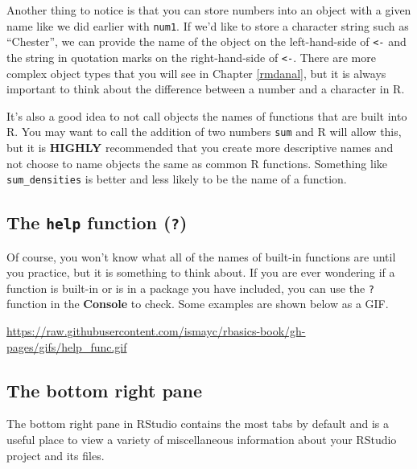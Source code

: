 \documentclass[]{tufte-book}
\begin{document}
Another thing to notice is that you can store numbers into an object
with a given name like we did earlier with \texttt{num1}. If we'd like
to store a character string such as ``Chester'', we can provide the name
of the object on the left-hand-side of \texttt{\textless{}-} and the
string in quotation marks on the right-hand-side of
\texttt{\textless{}-}. There are more complex object types that you will
see in Chapter \ref{rmdanal}, but it is always important to think about
the difference between a number and a character in R.

It's also a good idea to not call objects the names of functions that
are built into R. You may want to call the addition of two numbers
\texttt{sum} and R will allow this, but it is \textbf{HIGHLY}
recommended that you create more descriptive names and not choose to
name objects the same as common R functions. Something like
\texttt{sum\_densities} is better and less likely to be the name of a
function.

\subsection{\texorpdfstring{The \texttt{help} function
(\texttt{?})}{The help function (?)}}\label{the-help-function}

Of course, you won't know what all of the names of built-in functions
are until you practice, but it is something to think about. If you are
ever wondering if a function is built-in or is in a package you have
included, you can use the \texttt{?} function in the \textbf{Console} to
check. Some examples are shown below as a GIF.

\vspace{0.1in}

\begin{center}\footnotesize{\url{https://raw.githubusercontent.com/ismayc/rbasics-book/gh-pages/gifs/help_func.gif}}\end{center}

\vspace{0.1in}

\subsection{The bottom right pane}\label{the-bottom-right-pane}

The bottom right pane in RStudio contains the most tabs by default and
is a useful place to view a variety of miscellaneous information about
your RStudio project and its files.
\end{document}
